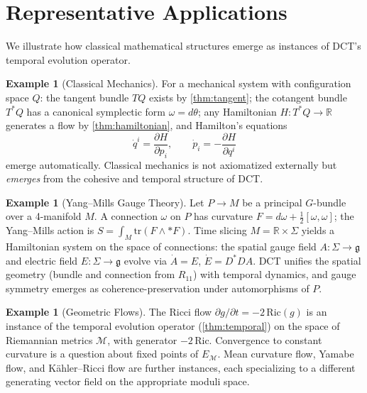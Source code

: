 \documentclass[11pt,a4paper]{article}
\theoremstyle{plain}
\theoremstyle{definition}
\newtheorem{example}[theorem]{Example}
\theoremstyle{remark}
\newcommand{\R}{\mathbb{R}}
\begin{document}
\section{Representative Applications}
\label{sec:applications}

We illustrate how classical mathematical structures emerge as instances of DCT's temporal evolution operator.

\begin{example}[Classical Mechanics]
\label{ex:mechanics}
For a mechanical system with configuration space $Q$:
the tangent bundle $TQ$ exists by \cref{thm:tangent};
the cotangent bundle $T^*Q$ has a canonical symplectic form $\omega = d\theta$;
any Hamiltonian $H : T^*Q \to \R$ generates a flow by \cref{thm:hamiltonian}, and Hamilton's equations
\begin{equation}
    \dot{q}^i = \frac{\partial H}{\partial p_i}, \qquad \dot{p}_i = -\frac{\partial H}{\partial q^i}
\end{equation}
emerge automatically.
Classical mechanics is not axiomatized externally but \emph{emerges} from the cohesive and temporal structure of DCT.
\end{example}

\begin{example}[Yang--Mills Gauge Theory]
\label{ex:gauge}
Let $P \to M$ be a principal $G$-bundle over a 4-manifold $M$.
A connection $\omega$ on $P$ has curvature $F = d\omega + \frac{1}{2}[\omega, \omega]$;
the Yang--Mills action is $S = \int_M \mathrm{tr}(F \wedge {*}F)$.
Time slicing $M = \R \times \Sigma$ yields a Hamiltonian system on the space of connections:
the spatial gauge field $A : \Sigma \to \mathfrak{g}$ and electric field $E : \Sigma \to \mathfrak{g}$ evolve via $\dot{A} = E$, $\dot{E} = D^*DA$.
DCT unifies the spatial geometry (bundle and connection from $R_{11}$) with temporal dynamics, and gauge symmetry emerges as coherence-preservation under automorphisms of $P$.
\end{example}

\begin{example}[Geometric Flows]
\label{ex:flows}
The Ricci flow $\partial g / \partial t = -2\,\mathrm{Ric}(g)$ is an instance of the temporal evolution operator (\cref{thm:temporal}) on the space of Riemannian metrics $\mathcal{M}$, with generator $-2\,\mathrm{Ric}$.
Convergence to constant curvature is a question about fixed points of $E_{\mathcal{M}}$.
Mean curvature flow, Yamabe flow, and K\"ahler--Ricci flow are further instances, each specializing to a different generating vector field on the appropriate moduli space.
\end{example}
\end{document}
